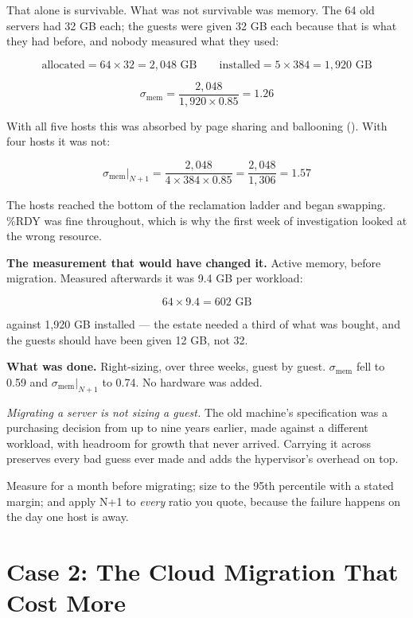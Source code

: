 That alone is survivable. What was not survivable was memory. The 64 old
servers had 32 GB each; the guests were given 32 GB each because that is what
they had before, and nobody measured what they used:

\[ \text{allocated} = 64 \times 32 = 2{,}048 \text{ GB} \qquad
   \text{installed} = 5 \times 384 = 1{,}920 \text{ GB} \]

\[ \sigma_{\text{mem}} = \frac{2{,}048}{1{,}920 \times 0.85} = 1.26 \]

With all five hosts this was absorbed by page sharing and ballooning
(). With four hosts it was not:

\[ \sigma_{\text{mem}}\big|_{N+1} = \frac{2{,}048}{4 \times 384 \times 0.85}
   = \frac{2{,}048}{1{,}306} = 1.57 \]

The hosts reached the bottom of the reclamation ladder and began swapping.
\%RDY was fine throughout, which is why the first week of investigation looked
at the wrong resource.

\textbf{The measurement that would have changed it.} Active memory, before
migration. Measured afterwards it was 9.4 GB per workload:

\[ 64 \times 9.4 = 602 \text{ GB} \]

against 1{,}920 GB installed --- the estate needed a third of what was bought,
and the guests should have been given 12 GB, not 32.

\textbf{What was done.} Right-sizing, over three weeks, guest by guest.
$\sigma_{\text{mem}}$ fell to 0.59 and $\sigma_{\text{mem}}|_{N+1}$ to 0.74. No
hardware was added.

\begin{conceptbox}
\emph{Migrating a server is not sizing a guest.} The old machine's
specification was a purchasing decision from up to nine years earlier, made
against a different workload, with headroom for growth that never arrived.
Carrying it across preserves every bad guess ever made and adds the
hypervisor's overhead on top.

\smallskip
Measure for a month before migrating; size to the 95th percentile with a stated
margin; and apply N+1 to \emph{every} ratio you quote, because the failure
happens on the day one host is away.
\end{conceptbox}

\section{Case 2: The Cloud Migration That Cost More}

